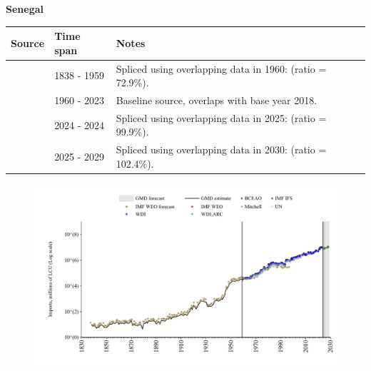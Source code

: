 \documentclass[12pt,a4paper,landscape]{article}
\begin{document}
\begin{adjustbox}{max totalsize={\paperwidth}{\paperheight},center}
\begin{minipage}[t][\textheight][t]{\textwidth}
\vspace*{0.5cm}
{}
\begin{center}
{\Large\bfseries Senegal}
\end{center}
\vspace{0.5cm}
\begin{table}[H]
\centering
\small
\begin{tabular}{|l|l|l|}
\hline
\textbf{Source} & \textbf{Time span} & \textbf{Notes} \\
\hline
\rowcolor{white}\cite{Mitchell}& 1838 - 1959 &Spliced using overlapping data in 1960: (ratio = 72.9\%).\\
\rowcolor{lightgray}\cite{WDI}& 1960 - 2023 &Baseline source, overlaps with base year 2018.\\
\rowcolor{white}\cite{BCEAO}& 2024 - 2024 &Spliced using overlapping data in 2025: (ratio = 99.9\%).\\
\rowcolor{lightgray}\cite{IMF_WEO_forecast}& 2025 - 2029 &Spliced using overlapping data in 2030: (ratio = 102.4\%).\\
\hline
\end{tabular}
\end{table}
\begin{figure}[H]
\centering
\includegraphics[width=\textwidth,height=0.6\textheight,keepaspectratio]{graphs/SEN_imports.pdf}
\end{figure}
\end{minipage}
\end{adjustbox}
\end{document}
